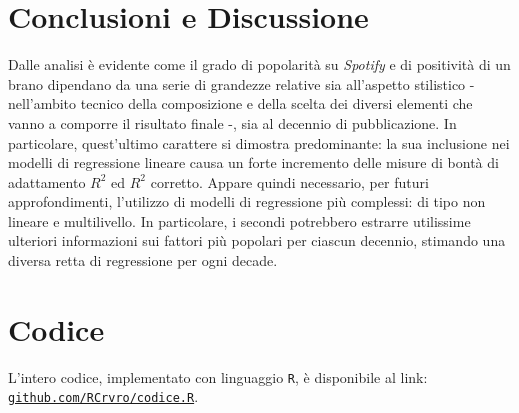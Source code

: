 \documentclass[fleqn,10pt]{SelfArx} %
\begin{document}
\section{Conclusioni e Discussione}
Dalle analisi è evidente come il grado di popolarità su \textit{Spotify} e di positività di un brano dipendano da una serie di grandezze relative sia all'aspetto stilistico - nell'ambito tecnico della composizione e della scelta dei diversi elementi che vanno a comporre il risultato finale -, sia al decennio di pubblicazione. In particolare, quest'ultimo carattere si dimostra predominante: la sua inclusione nei modelli di regressione lineare causa un forte incremento delle misure di bontà di adattamento $R^2$ ed $R^2$ corretto. Appare quindi necessario, per futuri approfondimenti, l'utilizzo di modelli di regressione più complessi: di tipo non lineare e multilivello. In particolare, i secondi potrebbero estrarre utilissime ulteriori informazioni sui fattori più popolari per ciascun decennio, stimando una diversa retta di regressione per ogni decade.
\section*{Codice}
L'intero codice, implementato con linguaggio \texttt{R}, è disponibile al link: \href{https://github.com/RCrvro/Foundation-of-Prob.-and-Stat.---Final-Project/blob/master/codice.R}{\texttt{github.com/RCrvro/codice.R}}.
\end{document}
